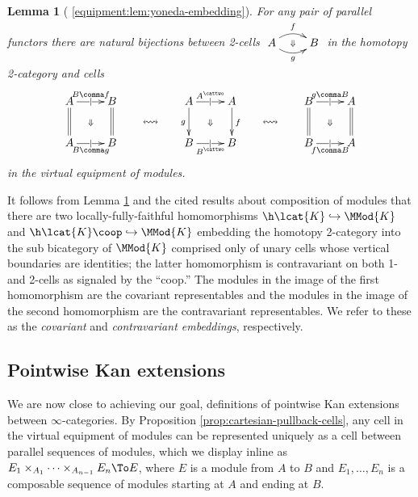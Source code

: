 \documentclass[12pt,reqno]{amsart}
\theoremstyle{plain}
\newtheorem{lem}[thm]{Lemma}
\theoremstyle{definition}
\theoremstyle{remark}
\numberwithin{equation}{subsection}
\newcommand{\extRef}[3]{%
  {\protect\IfBeginWith{#3}{itm:}{}{#2.}}\ref*{#1:#3}}
\newcommand{\refV}{\extRef{equipment}{V}}
\begin{document}
\begin{lem}[{\refV{lem:yoneda-embedding}}]\label{lem:yoneda-embedding} For any pair of parallel functors there are natural bijections between 2-cells
$ \xymatrix{ A \ar@/^2ex/[r]^f \ar@/_2ex/[r]_g \ar@{}[r]|{\Downarrow} & B}$ in the homotopy 2-category and cells
\[ \xymatrix{  A \ar@{=}[d] \ar[r]|\mid^{B \comma f} \ar@{}[dr]|{\Downarrow} & B \ar@{=}[d] & \ar@{}[d]|{\displaystyle\leftrightsquigarrow} & A \ar[r]|\mid^{A^{\cattwo}} \ar[d]_g  \ar@{}[dr]|{\Downarrow} & A \ar[d]^f &  \ar@{}[d]|{\displaystyle\leftrightsquigarrow} & B \ar@{}[dr]|{\Downarrow} \ar@{=}[d] \ar[r]|\mid^{g \comma B} & A \ar@{=}[d] \\ A \ar[r]|\mid_{B \comma g} & B & & B \ar[r]|\mid_{B^\cattwo} & B & & B \ar[r]|\mid_{f \comma B} & A}\]  
in the virtual equipment of modules.
\end{lem}

It follows from Lemma \ref{lem:yoneda-embedding} and the cited results about composition of modules  that there are two locally-fully-faithful homomorphisms $\h\lcat{K} \hookrightarrow \MMod{K}$ and $\h\lcat{K}\coop \hookrightarrow\MMod{K}$ embedding the homotopy 2-category into the sub bicategory of $\MMod{K}$ comprised only of unary cells whose vertical boundaries are identities; the latter homomorphism is contravariant on both 1- and 2-cells as signaled by the ``coop.'' The modules in the image of the first homomorphism are the covariant representables and the modules in the image of the second homomorphism are the contravariant representables. We refer to these as the \emph{covariant} and \emph{contravariant embeddings}, respectively.

\subsection{Pointwise Kan extensions}

We are now close to achieving our goal, definitions of pointwise Kan extensions between $\infty$-categories. By Proposition \ref{prop:cartesian-pullback-cells}, any cell in the virtual equipment of modules  can be represented uniquely as a cell between parallel sequences of modules, which we display inline as $E_1 \times_{A_1} \cdots \times_{A_{n-1}} E_n \To E$, where $E$ is a module from $A$ to $B$ and $E_1,\ldots, E_n$ is a composable sequence of modules starting at $A$ and ending at $B$. 
\end{document}
